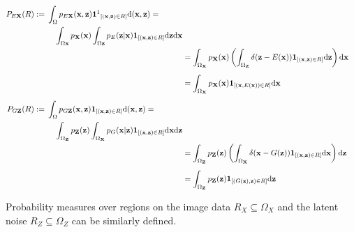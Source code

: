  \begin{align}
    \begin{split}\label{eqn:prob_measure1}
    P_{E \mathbf{X}}(R)  :={}&\int_{\Omega} p_{E \mathbf{X}}(\mathbf{x}, \mathbf{z})
    \mathbf{1\footnotemark}_{[(\mathbf{x}, \mathbf{z}) \in R]} \mathrm{d}(\mathbf{x}, \mathbf{z})= \\ 
    & \quad \int_{\Omega \mathbf{x}} p_{\mathbf{X}}(\mathbf{x}) \int_{\Omega \mathbf{z}} p_{E}(\mathbf{z} | \mathbf{x})
    \mathbf{1}_{[(\mathbf{x}, \mathbf{z}) \in R]} \mathrm{d} \mathbf{z} \mathrm{d} \mathbf{x}       
    \end{split}\\
    {}&=\int_{\Omega_{\mathbf{X}}} p_{\mathbf{X}}(\mathbf{x})\left(\int_{\Omega_{\mathbf{Z}}} \delta(\mathbf{z}-E(\mathbf{x})) \mathbf{1}_{[(\mathbf{x}, \mathbf{z}) \in R]} \mathrm{d} \mathbf{z}\right) \mathrm{d} \mathbf{x} \\[5pt]
    {}& =\int_{\Omega_{\mathbf{X}}} p_{\mathbf{X}}(\mathbf{x}) \mathbf{1}_{[(\mathbf{x}, E(\mathbf{x})) \in R]} \mathrm{d} \mathbf{x} \\[5pt]
    \begin{split}\label{eqn:prob_measure2}
    P_{G \mathbf{Z}}(R) :={}&\int_{\Omega} p_{G \mathbf{Z}}(\mathbf{x}, \mathbf{z}) 
    \mathbf{1}_{[(\mathbf{x},\mathbf{z}) \in R]} \mathrm{d}(\mathbf{x}, \mathbf{z})= \\ 
    & \quad \int_{\Omega_{\mathbf{Z}}} p_{\mathbf{Z}}(\mathbf{z}) \int_{\Omega_{\mathbf{X}}} p_{G}(\mathbf{x} | \mathbf{z})
    \mathbf{1}_{[(\mathbf{x}, \mathbf{z}) \in R]} \mathrm{d} \mathbf{x} \mathrm{d} \mathbf{z} 
    \end{split}\\
    {}&=\int_{\Omega_{\mathbf{Z}}} p_{\mathbf{Z}}(\mathbf{z})\left(\int_{\Omega_{\mathbf{X}}} \delta(\mathbf{x}-G(\mathbf{z})) \mathbf{1}_{[(\mathbf{x}, \mathbf{z}) \in R]} \mathrm{d} \mathbf{x}\right) \mathrm{d} \mathbf{z} \\[5pt]
    {}& =\int_{\Omega_{\mathbf{Z}}} p_{\mathbf{Z}}(\mathbf{z}) \mathbf{1}_{[(G(\mathbf{z}), \mathbf{z}) \in R]} \mathrm{d} \mathbf{z}
\end{align}        

Probability measures over regions on the image data $R_X \subseteq \Omega_{X}$ and the latent noise
$R_Z \subseteq \Omega_{Z}$ can be similarly defined.

